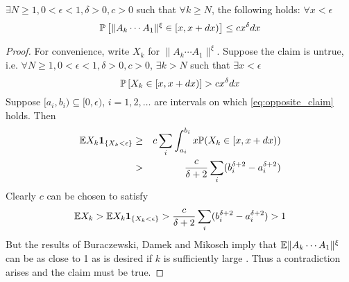 \documentclass{article}
\begin{document}
\begin{lemma}\label{eq:prob_bound}
  $\exists N \geq 1, 0 < \epsilon < 1, \delta > 0, c > 0$ such that $\forall k \geq
  N$, the following holds: $\forall x < \epsilon$
  \[
  \P\left[
    \|A_k \cdots A_1\|^\xi \in [x, x + dx)
  \right] \leq c x^\delta dx
  \]
\end{lemma}

\begin{proof}
  For convenience, write $X_k$ for
  $\|A_k \cdots A_1\|^\xi$.
  Suppose the claim is untrue, i.e. $\forall N \geq 1, 0 < \epsilon < 1,
  \delta > 0, c > 0$, $\exists k > N$ such that $\exists x < \epsilon$
  \begin{equation}
    \label{eq:opposite_claim}
    \P\left[
      X_k \in [x, x + dx)
    \right] > c x^\delta dx
  \end{equation}
  Suppose $[a_i, b_i) \subseteq [0, \epsilon)$, $i = 1, 2, \dots$ are
  intervals on which \eqref{eq:opposite_claim} holds. Then
  \begin{eqnarray*}
    \E X_k \1{X_k < \epsilon} &\geq&
    c \sum_{i} \int_{a_i}^{b_i} x \P(X_k \in [x, x+dx)) \\
    &>& {c \over \delta + 2} \sum_i
    (b_i^{\delta + 2} - a_i^{\delta + 2})
  \end{eqnarray*}
  Clearly $c$ can be chosen to satisfy
  \begin{eqnarray*}
    \E X_k > \E X_k \1{X_k < \epsilon} > {c \over \delta + 2} \sum_i
    (b_i^{\delta + 2} - a_i^{\delta + 2}) > 1
  \end{eqnarray*}
  But the results of Buraczewski, Damek and Mikosch imply that $\E
  \|A_k \cdots A_1\|^\xi$ can be as close to 1 as is desired if $k$ is
  sufficiently large \cite{BuraczewskiDamekMikosch2015}. Thus a
  contradiction arises and the claim must be true.
\end{proof}
\end{document}
